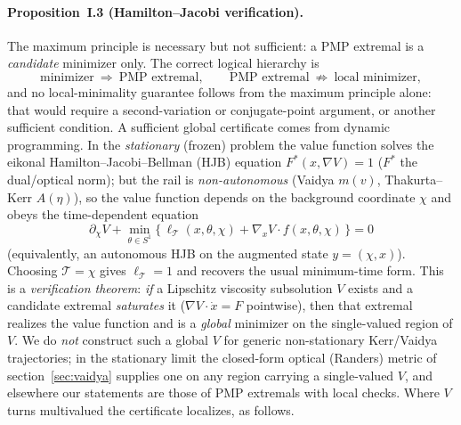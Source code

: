 \documentclass[12pt]{iopart}
\begin{document}
\paragraph{Proposition~I.3 (Hamilton--Jacobi verification).} The maximum
principle is necessary but not sufficient: a PMP extremal is a \emph{candidate}
minimizer only. The correct logical hierarchy is
\[
   \text{minimizer}\ \Longrightarrow\ \text{PMP extremal},
   \qquad
   \text{PMP extremal}\ \not\Longrightarrow\ \text{local minimizer},
\]
and no local-minimality guarantee follows from the maximum principle alone: that
would require a second-variation or conjugate-point argument, or another
sufficient condition. A sufficient global certificate
comes from dynamic programming. In the \emph{stationary} (frozen) problem the value
function solves the eikonal Hamilton--Jacobi--Bellman (HJB) equation
$F^\ast(x,\nabla V)=1$ ($F^\ast$ the dual/optical norm); but the rail is
\emph{non-autonomous} (Vaidya $m(v)$, Thakurta--Kerr $A(\eta)$), so the value function
depends on the background coordinate $\chi$ and obeys the time-dependent equation
\begin{equation}
  \partial_\chi V+\min_{\theta\in S^1}\big\{\,\ell_{\mathcal T}(x,\theta,\chi)
  +\nabla_x V\cdot f(x,\theta,\chi)\,\big\}=0
  \label{eq:hjb}
\end{equation}
(equivalently, an autonomous HJB on the augmented state $y=(\chi,x)$). Choosing
$\mathcal T=\chi$ gives $\ell_{\mathcal T}=1$ and recovers the usual minimum-time form.
This is a
\emph{verification theorem}: \emph{if} a Lipschitz viscosity subsolution $V$ exists
and a candidate extremal \emph{saturates} it ($\nabla V\cdot\dot x=F$ pointwise), then
that extremal realizes the value function and is a \emph{global} minimizer on the
single-valued region of $V$. We do \emph{not} construct such a global $V$ for generic
non-stationary Kerr/Vaidya trajectories; in the stationary limit the closed-form
optical (Randers) metric of section~\ref{sec:vaidya} supplies one on
any region carrying a single-valued $V$, and elsewhere our statements are those of PMP
extremals with local checks. Where $V$ turns multivalued the certificate localizes, as
follows.
\end{document}
